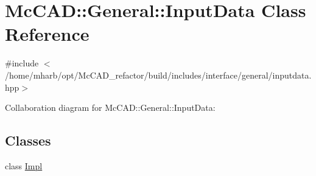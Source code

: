 \hypertarget{classMcCAD_1_1General_1_1InputData}{}\section{Mc\+C\+AD\+:\+:General\+:\+:Input\+Data Class Reference}
\label{classMcCAD_1_1General_1_1InputData}


{\ttfamily \#include $<$/home/mharb/opt/\+Mc\+C\+A\+D\+\_\+refactor/build/includes/interface/general/inputdata.\+hpp$>$}



Collaboration diagram for Mc\+C\+AD\+:\+:General\+:\+:Input\+Data\+:
\subsection*{Classes}
\begin{DoxyCompactItemize}
\item 
class \hyperlink{classMcCAD_1_1General_1_1InputData_1_1Impl}{Impl}
\end{DoxyCompactItemize}

